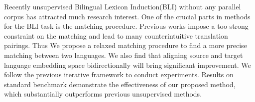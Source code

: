 Recently unsupervised Bilingual Lexicon Induction(BLI) without any parallel corpus has attracted much research interest. One of the crucial parts in methods for the BLI task is the matching procedure. Previous works impose a too strong constraint on the matching and lead to many counterintuitive translation pairings. Thus We propose a relaxed matching procedure to find a more precise matching between two languages. We also find that aligning source and target language embedding space bidirectionally will bring significant improvement. We follow the previous iterative framework to conduct experiments. Results on standard benchmark demonstrate the effectiveness of our proposed method, which substantially outperforms previous unsupervised methods.
